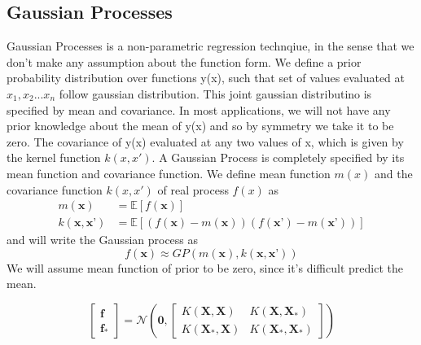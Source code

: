 \subsection{Gaussian Processes}
Gaussian Processes is a non-parametric regression technqiue, in the sense that we don't make any assumption about the function form. We define a prior probability distribution over functions y(x), such that set of values evaluated at $x_1, x_2 ... x_n$ follow gaussian distribution. This joint gaussian distributino is specified by mean and covariance. In most applications, we will not have any
prior knowledge about the mean of y(x) and so by symmetry we take it to be zero. The covariance of y(x) evaluated at any two values of x,
which is given by the kernel function $k(x, x')$.
A Gaussian Process is completely specified by its mean function and covariance function. We define mean function $m(x)$ and the covariance function $k(x, x')$ of real process $f(x)$ as
\begin{align}
	m(\textbf{x}) &= \mathbb{E}\left[ f(\textbf{x}) \right] \\
	k(\textbf{x}, \textbf{x'}) &= \mathbb{E} \left[ (f(\textbf{x})-m(\textbf{x}))(f(\textbf{x'})-m(\textbf{x'}))\right]
\end{align}
and will write the Gaussian process as
\begin{equation}
	f(\textbf{x}) \approx GP\left(m(\textbf{x}), k(\textbf{x},\textbf{x'})\right)
\end{equation}
We will assume mean function of prior to be zero, since it's difficult predict the mean.

\[
\begin{bmatrix}
	\textbf{f} \\ \mathbf{f_*}
\end{bmatrix} = \mathcal{N} \left( \textbf{0}, \begin{bmatrix}
K(\textbf{X}, \textbf{X}) & K(\textbf{X}, \mathbf{X_*})\\ K(\mathbf{X_*}, \textbf{X}) & K(\mathbf{X_*}, \mathbf{X_*}) 
\end{bmatrix} \right)
\]

